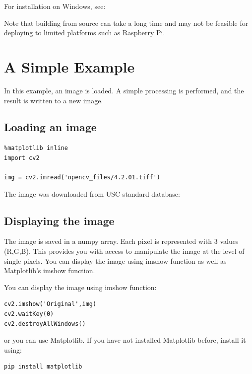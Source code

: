 For installation on Windows, see:


Note that building from source can take a long time and may not be
feasible for deploying to limited platforms such as Raspberry Pi.

\section{A Simple Example}\label{a-simple-example}

In this example, an image is loaded. A simple processing is performed,
and the result is written to a new image.

\subsection{Loading an image}\label{loading-an-image}

\begin{verbatim}
%matplotlib inline
import cv2

img = cv2.imread('opencv_files/4.2.01.tiff') 
\end{verbatim}

The image was downloaded from USC standard database:


\subsection{Displaying the image}\label{displaying-the-image}

The image is saved in a numpy array. Each pixel is represented with 3
values (R,G,B). This provides you with access to manipulate the image at
the level of single pixels. You can display the image using imshow
function as well as Matplotlib's imshow function.

You can display the image using imshow function:

\begin{verbatim}
cv2.imshow('Original',img)
cv2.waitKey(0)
cv2.destroyAllWindows()
\end{verbatim}

or you can use Matplotlib. If you have not installed Matplotlib before,
install it using:

\begin{verbatim}
pip install matplotlib
\end{verbatim}


